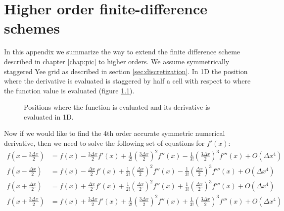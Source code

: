 
\chapter{Higher order finite-difference schemes}
\label{app:finite-diff}

In this appendix we summarize the way to extend the finite difference scheme
described in chapter \ref{chap:pic} to higher orders. We assume symmetrically
staggered Yee grid as described in section \ref{sec:discretization}. In 1D the
position where the derivative is evaluated is staggered by half a cell with
respect to where the function value is evaluated (figure
\ref{fig:finite-diff-pos}).

\begin{figure}[h]
  \centering
  \caption{Positions where the function is evaluated and its derivative is
    evaluated in 1D.}
  \label{fig:finite-diff-pos}
\end{figure}

Now if we would like to find the 4th order accurate symmetric numerical
derivative, then we need to solve the following set of equations for
$f'(x)$:
\begin{align}
  \label{eq:4th-order-set}
  f \left( x - \frac{3\Delta x}{2} \right) &= f(x) - \frac{3\Delta x}{2}f'(x) + \frac{1}{2!}\left(\frac{3\Delta x}{2}\right)^2f''(x) - \frac{1}{3!}\left( \frac{3\Delta x}{2} \right)^{3}f'''(x) + O(\Delta x^4) \\
  f \left( x - \frac{\Delta x}{2} \right) &= f(x) - \frac{\Delta x}{2}f'(x) + \frac{1}{2!}\left(\frac{\Delta x}{2}\right)^2f''(x) - \frac{1}{3!}\left( \frac{\Delta x}{2} \right)^{3}f'''(x) + O(\Delta x^4) \\
  f \left( x + \frac{\Delta x}{2} \right) &= f(x) + \frac{\Delta x}{2}f'(x) + \frac{1}{2!}\left(\frac{\Delta x}{2}\right)^2f''(x) + \frac{1}{3!}\left( \frac{\Delta x}{2} \right)^{3}f'''(x) + O(\Delta x^4) \\
  f \left( x + \frac{3\Delta x}{2} \right) &= f(x) + \frac{3\Delta x}{2}f'(x) + \frac{1}{2!}\left(\frac{3\Delta x}{2}\right)^2f''(x) + \frac{1}{3!}\left( \frac{3\Delta x}{2} \right)^{3}f'''(x) + O(\Delta x^4)
\end{align}

